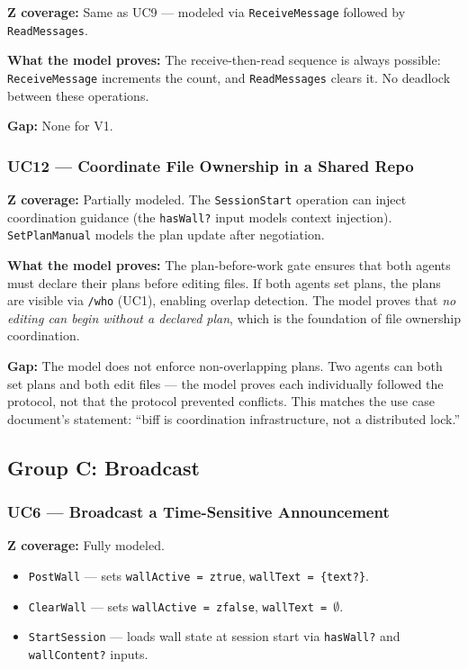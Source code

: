 \documentclass[a4paper,10pt,fleqn]{article}
\begin{document}
\textbf{Z coverage:} Same as UC9 --- modeled via \texttt{ReceiveMessage}
followed by \texttt{ReadMessages}.

\textbf{What the model proves:} The receive-then-read sequence is
always possible: \texttt{ReceiveMessage} increments the count, and
\texttt{ReadMessages} clears it. No deadlock between these operations.

\textbf{Gap:} None for V1.

\subsubsection{UC12 --- Coordinate File Ownership in a Shared Repo}

\textbf{Z coverage:} Partially modeled. The \texttt{SessionStart}
operation can inject coordination guidance (the \texttt{hasWall?} input
models context injection). \texttt{SetPlanManual} models the plan update
after negotiation.

\textbf{What the model proves:} The plan-before-work gate ensures that
both agents must declare their plans before editing files. If both agents
set plans, the plans are visible via \texttt{/who} (UC1), enabling
overlap detection. The model proves that \emph{no editing can begin
without a declared plan}, which is the foundation of file ownership
coordination.

\textbf{Gap:} The model does not enforce non-overlapping plans. Two
agents can both set plans and both edit files --- the model proves each
individually followed the protocol, not that the protocol prevented
conflicts. This matches the use case document's statement: ``biff is
coordination infrastructure, not a distributed lock.''

\subsection{Group C: Broadcast}

\subsubsection{UC6 --- Broadcast a Time-Sensitive Announcement}

\textbf{Z coverage:} Fully modeled.

\begin{itemize}
  \item \texttt{PostWall} --- sets \texttt{wallActive = ztrue},
    \texttt{wallText = \{text?\}}.
  \item \texttt{ClearWall} --- sets \texttt{wallActive = zfalse},
    \texttt{wallText = $\emptyset$}.
  \item \texttt{StartSession} --- loads wall state at session start
    via \texttt{hasWall?} and \texttt{wallContent?} inputs.
\end{itemize}
\end{document}

